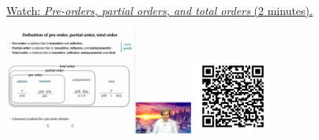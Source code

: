
\begin{minipage}{10cm}
    \href{https://act4e-spring21.netlify.app/videos/spring2021-tradeoffs:tradeoffs:orders:pre-pos-tot.html}{Watch: \emph{Pre-orders, partial orders, and total orders} (2 minutes).}
        
    \href{https://act4e-spring21.netlify.app/videos/spring2021-tradeoffs:tradeoffs:orders:pre-pos-tot.html}{\includegraphics[height=3.5cm]{spring2021-tradeoffs:tradeoffs:orders:pre-pos-tot/thumbnails.jpg}}
    \href{https://act4e-spring21.netlify.app/videos/spring2021-tradeoffs:tradeoffs:orders:pre-pos-tot.html}{\includegraphics[height=2.5cm]{spring2021-tradeoffs:tradeoffs:orders:pre-pos-tot/qrcode.png}}
\end{minipage}
